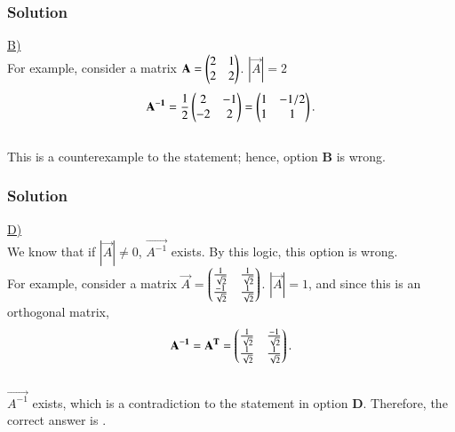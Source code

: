 \documentclass{beamer}
\begin{document}
\begin{frame}[fragile]
    \frametitle{Solution}
\underline{B)}\\

For example, consider a matrix $\mathbf{A} = \begin{pmatrix}2 & 1 \\ 2 & 2\end{pmatrix}$. $|\vec{A}| = 2$
\begin{align*}
    \mathbf{A^{-1}} = \frac{1}{2}\begin{pmatrix}2 & -1 \\ -2 & 2\end{pmatrix} = \begin{pmatrix}1 & -1/2 \\ 1 & 1\end{pmatrix}.
\end{align*}\\

This is a counterexample to the statement; hence, option \textbf{B} is wrong.

\end{frame}
\begin{frame}[fragile]
    \frametitle{Solution}

\underline{D)}\\

We know that if $|\vec{A}| \neq 0$, $\vec{A^{-1}}$ exists. By this logic, this option is wrong.\\

For example, consider a matrix $\vec{A}$ = $\begin{pmatrix}\frac{1}{\sqrt{2}} & \frac{1}{\sqrt{2}} \\ \frac{-1}{\sqrt{2}} & \frac{1}{\sqrt{2}}\end{pmatrix}$. $|\vec{A}| = 1$, and since this is an orthogonal matrix, 
\begin{align*}
\mathbf{A^{-1}} = \mathbf{A^T} = \begin{pmatrix}\frac{1}{\sqrt{2}} & \frac{-1}{\sqrt{2}} \\ \frac{1}{\sqrt{2}} & \frac{1}{\sqrt{2}}\end{pmatrix}. \end{align*}\\

$\vec{A^{-1}}$ exists, which is a contradiction to the statement in option \textbf{D}.
Therefore, the correct answer is .
\end{frame}
\end{document}
